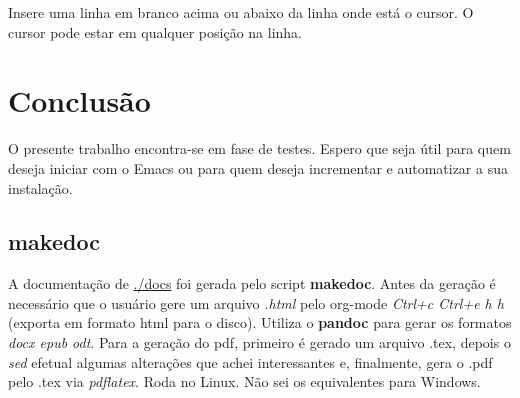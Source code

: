\documentclass[]{article}
\begin{document}
Insere uma linha em branco acima ou abaixo da linha onde está o cursor.
O cursor pode estar em qualquer posição na linha.

\section{Conclusão}\label{conclusuxe3o}

O presente trabalho encontra-se em fase de testes. Espero que seja útil
para quem deseja iniciar com o Emacs ou para quem deseja incrementar e
automatizar a sua instalação.

\subsection{makedoc}\label{makedoc}

A documentação de \url{./docs} foi gerada pelo script \textbf{makedoc}.
Antes da geração é necessário que o usuário gere um arquivo \emph{.html}
pelo org-mode \emph{Ctrl+c Ctrl+e h h} (exporta em formato html para o
disco). Utiliza o \textbf{pandoc} para gerar os formatos \emph{docx epub
odt}. Para a geração do pdf, primeiro é gerado um arquivo .tex, depois o
\emph{sed} efetual algumas alterações que achei interessantes e,
finalmente, gera o .pdf pelo .tex via \emph{pdflatex}. Roda no Linux.
Não sei os equivalentes para Windows.
\end{document}

